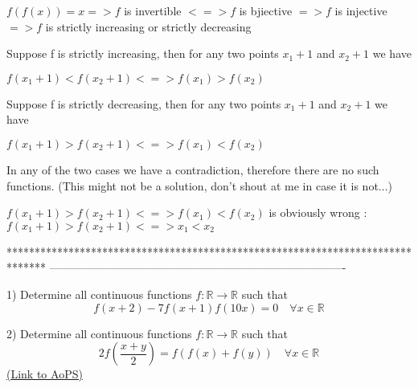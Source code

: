 \begin{solution}
	\begin{tcolorbox}$f(f(x))=x  =>  f $ is invertible $ <=>  f $ is bjiective $ =>  f $ is injective$ =>  f $ is strictly increasing or strictly decreasing

Suppose f is strictly increasing, then for any two points $x_{1}+1$ and $x_{2}+1$ we have  

$ f(x_{1}+1)<f(x_{2}+1) <=> f(x_{1})>f(x_{2})$

Suppose f is strictly decreasing, then for any two points $x_{1}+1$ and $x_{2}+1$ we have  

$ f(x_{1}+1)>f(x_{2}+1) <=> f(x_{1})<f(x_{2})$

In any of the two cases we have a contradiction, therefore there are no such functions.
(This might not be a solution, don't shout at me in case it is not...)\end{tcolorbox}
$ f(x_{1}+1)>f(x_{2}+1) <=> f(x_{1})<f(x_{2})$ is obviously wrong :
$ f(x_{1}+1)>f(x_{2}+1) <=> x_{1}<x_{2}$
\end{solution}
*******************************************************************************
-------------------------------------------------------------------------------

\begin{problem}
	1) Determine all continuous functions $f: \mathbb R\to\mathbb R$  such that 
\[f (x +2)-7f (x +1) f(10x) = 0 \quad \forall x\in\mathbb R\]

2) Determine all continuous functions $f: \mathbb R\to\mathbb R$  such that 
\[2f\left( \frac{ x + y}{ 2}\right) = f(f (x ) + f ( y) ) \quad \forall x\in\mathbb R\]
	\flushright \href{https://artofproblemsolving.com/community/c6h566942}{(Link to AoPS)}
\end{problem}



